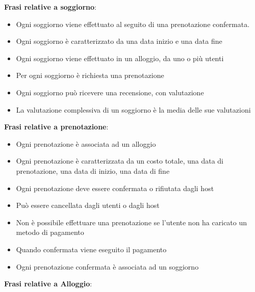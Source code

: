 \documentclass[letterpaper]{report}
\begin{document}
\bigskip
\textbf{Frasi relative a soggiorno}:
\begin{itemize}
    \item Ogni soggiorno viene effettuato al seguito di una prenotazione confermata.
    \item Ogni soggiorno è caratterizzato da una data inizio e una data fine
    \item Ogni soggiorno viene effettuato in un alloggio, da uno o più utenti
    \item Per ogni soggiorno è richiesta una prenotazione
    \item Ogni soggiorno può ricevere una recensione, con valutazione
    \item La valutazione complessiva di un soggiorno è la media delle sue valutazioni
\end{itemize}
\bigskip
\textbf{Frasi relative a prenotazione}:
\begin{itemize}
    \item Ogni prenotazione è associata ad un alloggio
    \item Ogni prenotazione è caratterizzata da un costo totale, una data di prenotazione, una data di inizio, una data di fine
    \item Ogni prenotazione deve essere confermata o rifiutata dagli host
    \item Può essere cancellata dagli utenti o dagli host
    \item Non è possibile effettuare una prenotazione se l'utente non ha caricato un metodo di pagamento
    \item Quando confermata viene eseguito il pagamento
    \item Ogni prenotazione confermata è associata ad un soggiorno \\
\end{itemize}
\bigskip
\textbf{Frasi relative a Alloggio}:
\end{document}
